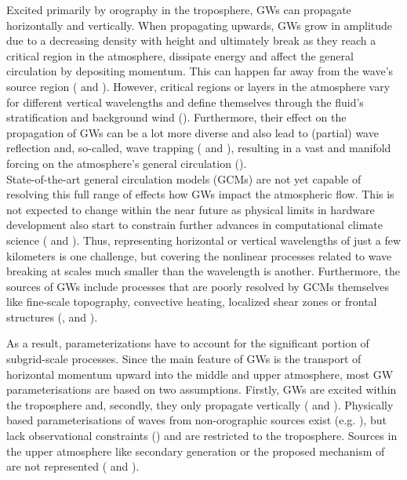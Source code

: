Excited primarily by orography in the troposphere, GWs can propagate horizontally and vertically. When propagating upwards, GWs grow in amplitude due to a decreasing density with height and ultimately break as they reach a critical region in the atmosphere, dissipate energy and affect the general circulation by depositing momentum. This can happen far away from the wave's source region (\cite{teixeira_physics_2014} and \cite{eliassen_transfer_1960}). However, critical regions or layers in the atmosphere vary for different vertical wavelengths and define themselves through the fluid's stratification and background wind (\cite{teixeira_physics_2014}). Furthermore, their effect on the propagation of GWs can be a lot more diverse and also lead to (partial) wave reflection and, so-called, wave trapping (\cite{fritts_gravity_2018} and \cite{scorer_theory_1949}), resulting in a vast and manifold forcing on the atmosphere's general circulation (\cite{alexander_recent_2010}). \\
State-of-the-art general circulation models (GCMs) are not yet capable of resolving this full range of effects how GWs impact the atmospheric flow. This is not expected to change within the near future as physical limits in hardware development also start to constrain further advances in computational climate science (\cite{balaji_climbing_2021} and \cite{balaji_climate_2015}). Thus, representing horizontal or vertical wavelengths of just a few kilometers is one challenge, but covering the nonlinear processes related to wave breaking at scales much smaller than the wavelength is another. Furthermore, the sources of GWs include processes that are poorly resolved by GCMs themselves like fine-scale topography, convective heating, localized shear zones or frontal structures (\cite{medvedev_gravity_2019}, \cite{fritts_gravity_2003} and \cite{plougonven_internal_2014}). 

As a result, parameterizations have to account for the significant portion of subgrid-scale processes. Since the main feature of GWs is the transport of horizontal momentum upward into the middle and upper atmosphere, most GW parameterisations are based on two assumptions. Firstly, GWs are excited within the troposphere and, secondly, they only propagate vertically (\cite{plougonven_how_2020} and \cite{alexander_recent_2010}). Physically based parameterisations of waves from non-orographic sources exist (e.g. \cite{scinocca_accurate_2003}), but lack observational constraints (\cite{plougonven_internal_2014}) and are restricted to the troposphere. Sources in the upper atmosphere like secondary generation or the proposed mechanism of \textcite{dornbrack_stratospheric_2021} are not represented (\cite{plougonven_how_2020} and \cite{kim_overview_2003}).

